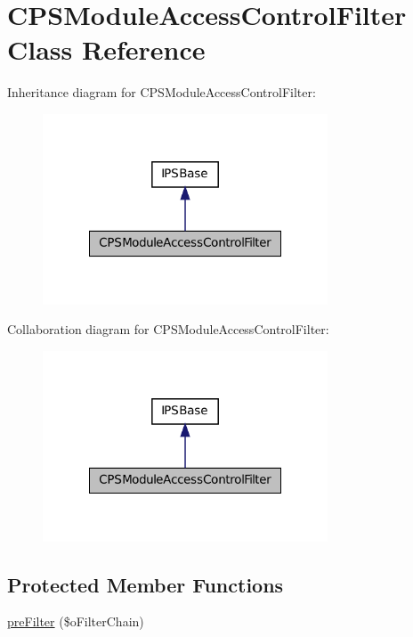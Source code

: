 \hypertarget{classCPSModuleAccessControlFilter}{
\section{CPSModuleAccessControlFilter Class Reference}
\label{classCPSModuleAccessControlFilter}
}


Inheritance diagram for CPSModuleAccessControlFilter:\nopagebreak
\begin{figure}[H]
\begin{center}
\leavevmode
\includegraphics[width=240pt]{classCPSModuleAccessControlFilter__inherit__graph}
\end{center}
\end{figure}


Collaboration diagram for CPSModuleAccessControlFilter:\nopagebreak
\begin{figure}[H]
\begin{center}
\leavevmode
\includegraphics[width=240pt]{classCPSModuleAccessControlFilter__coll__graph}
\end{center}
\end{figure}
\subsection*{Protected Member Functions}
\begin{DoxyCompactItemize}
\item 
\hyperlink{classCPSModuleAccessControlFilter_a761ef24f6700868d0719c74b601a7e08}{preFilter} (\$oFilterChain)
\end{DoxyCompactItemize}


